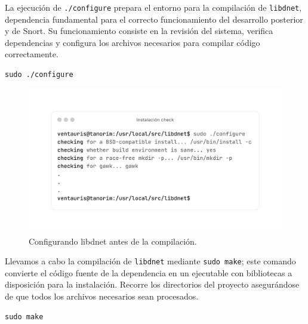 \documentclass[11pt,a4paper,twoside]{report}
\begin{document}
La ejecución de \texttt{./configure} prepara el entorno para la compilación de \texttt{libdnet}, dependencia fundamental para el correcto funcionamiento del desarrollo posterior y de Snort. Su funcionamiento consiste en la revisión del sistema, verifica dependencias y configura los archivos necesarios para compilar código correctamente.

\begin{lstlisting}[style=commandstyle, caption={Configurando libdnet con ./configure}]
	sudo ./configure
\end{lstlisting}

\begin{figure}[H]
	\centering
	\includegraphics[scale=0.12]{instalacion_snort/3-3.png}
	\caption{Configurando libdnet antes de la compilación.}
\end{figure}

\newpage

Llevamos a cabo la compilación de \texttt{libdnet} mediante \texttt{sudo make}; este comando convierte el código fuente de la dependencia en un ejecutable con bibliotecas a disposición para la instalación. Recorre los directorios del proyecto asegurándose de que todos los archivos necesarios sean procesados.

\begin{lstlisting}[style=commandstyle, caption={Compilando libdnet con make}]
	sudo make
\end{lstlisting}
\end{document}
